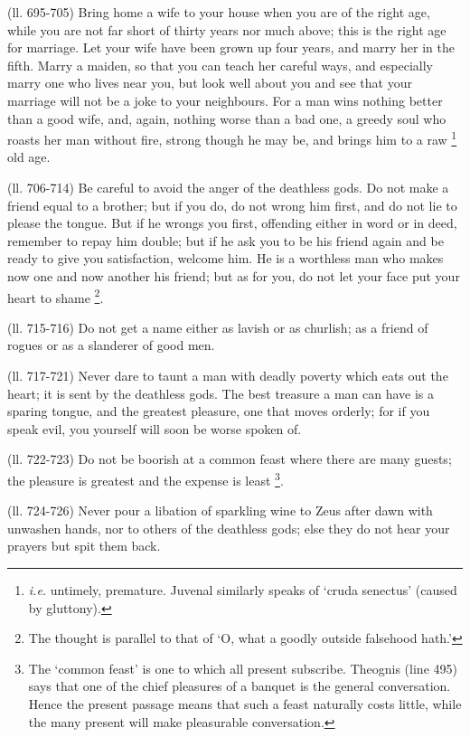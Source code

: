 (ll. 695-705) Bring home a wife to your house when you are of the right age,
while you are not far short of thirty years nor much above; this is the right
age for marriage. Let your wife have been grown up four years, and marry her in
the fifth. Marry a maiden, so that you can teach her careful ways, and
especially marry one who lives near you, but look well about you and see that
your marriage will not be a joke to your neighbours. For a man wins nothing
better than a good wife, and, again, nothing worse than a bad one, a greedy
soul who roasts her man without fire, strong though he may be, and brings him
to a raw \footnote{\emph{i.e.} untimely,
premature. Juvenal similarly speaks of ‘cruda senectus’ (caused by
gluttony).} old age.

(ll. 706-714) Be careful to avoid the anger of the deathless gods. Do not make
a friend equal to a brother; but if you do, do not wrong him first, and do not
lie to please the tongue. But if he wrongs you first, offending either in word
or in deed, remember to repay him double; but if he ask you to be his friend
again and be ready to give you satisfaction, welcome him. He is a worthless man
who makes now one and now another his friend; but as for you, do not let your
face put your heart to shame \footnote{The thought is parallel to
that of ‘O, what a goodly outside falsehood hath.’}.

(ll. 715-716) Do not get a name either as lavish or as churlish; as a friend of
rogues or as a slanderer of good men.

(ll. 717-721) Never dare to taunt a man with deadly poverty which eats out the
heart; it is sent by the deathless gods. The best treasure a man can have is a
sparing tongue, and the greatest pleasure, one that moves orderly; for if you
speak evil, you yourself will soon be worse spoken of.

(ll. 722-723) Do not be boorish at a common feast where there are many guests;
the pleasure is greatest and the expense is least \footnote{The ‘common
feast’ is one to which all present subscribe. Theognis (line 495) says
that one of the chief pleasures of a banquet is the general conversation. Hence
the present passage means that such a feast naturally costs little, while the
many present will make pleasurable conversation.}.

(ll. 724-726) Never pour a libation of sparkling wine to Zeus after dawn with
unwashen hands, nor to others of the deathless gods; else they do not hear your
prayers but spit them back.

